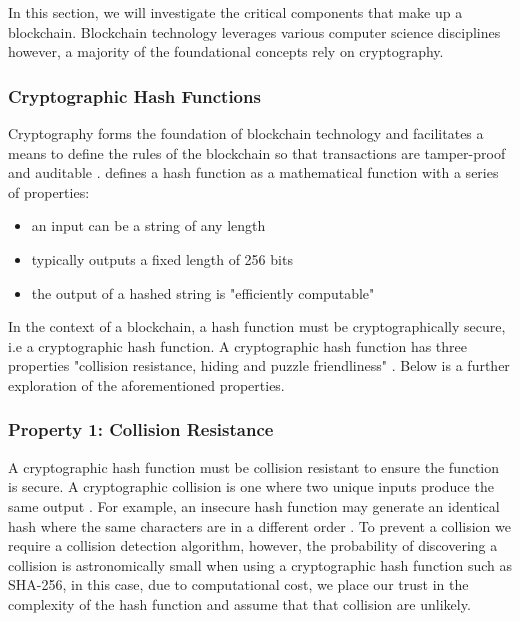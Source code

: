 In this section, we will investigate the critical components that make up a blockchain. Blockchain technology leverages various computer science disciplines however, a majority of the foundational concepts rely on cryptography. 

\subsubsection{Cryptographic Hash Functions}

Cryptography forms the foundation of blockchain technology and facilitates a means to define the rules of the blockchain so that transactions are tamper-proof and auditable \autocite{narayananBitcoinCryptocurrencyTechnologies2016}. \autocite{narayananBitcoinCryptocurrencyTechnologies2016} defines a hash function as a mathematical function with a series of properties:

\begin{itemize}
    \item an input can be a string of any length
    \item typically outputs a fixed length of 256 bits 
    \item the output of a hashed string is "efficiently computable"
\end{itemize}

In the context of a blockchain, a hash function must be cryptographically secure, i.e a cryptographic hash function. A cryptographic hash function has three properties "collision resistance, hiding and puzzle friendliness" \autocite{narayananBitcoinCryptocurrencyTechnologies2016}. Below is a further exploration of the aforementioned properties.

\subsubsection{Property 1: Collision Resistance}

A cryptographic hash function must be collision resistant to ensure the function is secure. A cryptographic collision is one where two unique inputs produce the same output \autocite{narayananBitcoinCryptocurrencyTechnologies2016}. For example, an insecure hash function may generate an identical hash where the same characters are in a different order \autocite{nakovPracticalCryptographyDevelopers2018}. To prevent a collision we require a collision detection algorithm, however, the probability of discovering a collision is astronomically small when using a cryptographic hash function such as SHA-256, in this case, due to computational cost, we place our trust in the complexity of the hash function and assume that that collision are unlikely.

